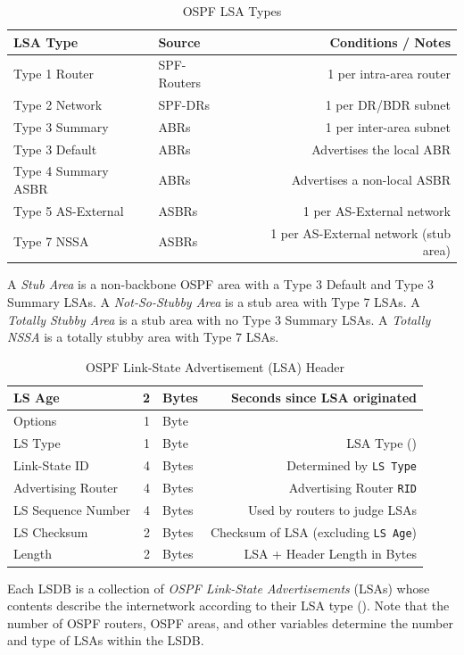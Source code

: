 \documentclass[12pt]{article}
\begin{document}
	\begin{table}[H]
	\centering
	\caption{OSPF LSA Types \label{tab:OSPF LSA TYPES}}
	\begin{tabular}{@{} l l r @{}}\hline
	\textbf{LSA Type}		& \textbf{Source}		& \textbf{Conditions / Notes}\\\hline
	Type 1 Router		& SPF-Routers		& 1 per intra-area router\\
	Type 2 Network		& SPF-DRs			& 1 per DR/BDR subnet\\
	Type 3 Summary		& ABRs			& 1 per inter-area subnet\\
	Type 3 Default		& ABRs			& Advertises the local ABR\\
	Type 4 Summary ASBR	& ABRs			& Advertises a non-local ASBR\\
	Type 5 AS-External	& ASBRs			& 1 per AS-External network\\
	Type 7 NSSA		& ASBRs			& 1 per AS-External network (stub area)\\\hline
	\end{tabular}\end{table}
	
	A \textit{Stub Area} is a non-backbone OSPF area with a Type 3 Default and Type 3 Summary LSAs. A \textit{Not-So-Stubby Area} is a stub area with Type 7 LSAs. A \textit{Totally Stubby Area} is a stub area with no Type 3 Summary LSAs. A \textit{Totally NSSA} is a totally stubby area with Type 7 LSAs.

	\begin{table}[H]
	\centering
	\caption{OSPF Link-State Advertisement (LSA) Header \label{tab:OSPF LSA}}
	\begin{tabular}{| l | r @{ } l | r |}\hline
	LS Age			& 2	& Bytes	& Seconds since LSA originated\\\hline
	Options			& 1	& Byte	&\\\hline
	LS Type			& 1	& Byte	& LSA Type (\Cref{tab:OSPF LSA TYPES})\\\hline
	Link-State ID		& 4	& Bytes	& Determined by \texttt{LS Type}\\\hline
	Advertising Router	& 4	& Bytes	& Advertising Router \texttt{RID}\\\hline
	LS Sequence Number	& 4	& Bytes	& Used by routers to judge LSAs\\\hline
	LS Checksum		& 2	& Bytes	& Checksum of LSA (excluding \texttt{LS Age})\\\hline
	Length			& 2	& Bytes	& LSA + Header Length in Bytes\\\hline
	\end{tabular}\end{table}
	Each LSDB is a collection of \textit{OSPF Link-State Advertisements} (LSAs) whose contents describe the internetwork according to their LSA type (). Note that the number of OSPF routers, OSPF areas, and other variables determine the number and type of LSAs within the LSDB.
\end{document}
